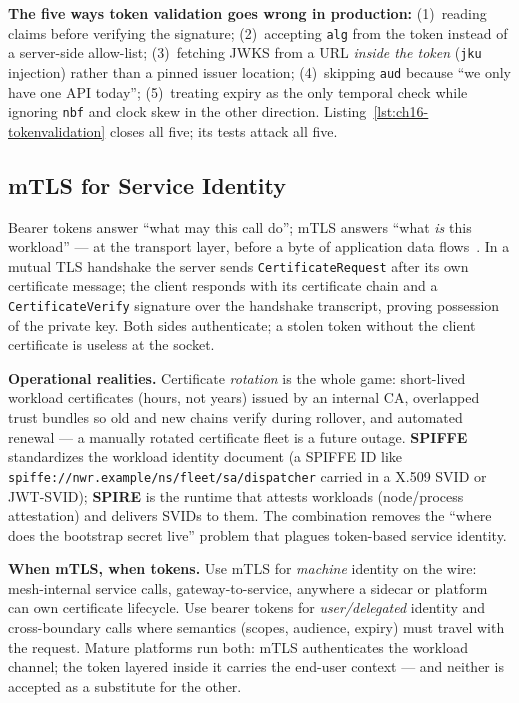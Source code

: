 \begin{warningbox}
\textbf{The five ways token validation goes wrong in production:}
(1)~reading claims before verifying the signature; (2)~accepting
\texttt{alg} from the token instead of a server-side allow-list;
(3)~fetching JWKS from a URL \emph{inside the token} (\texttt{jku}
injection) rather than a pinned issuer location; (4)~skipping
\texttt{aud} because ``we only have one API today''; (5)~treating expiry as
the only temporal check while ignoring \texttt{nbf} and clock skew in the
other direction. Listing~\ref{lst:ch16-tokenvalidation} closes all five;
its tests attack all five.
\end{warningbox}

\subsection{mTLS for Service Identity}
\label{sec:ch16-mtls}

Bearer tokens answer ``what may this call do''; mTLS answers ``what
\emph{is} this workload'' --- at the transport layer, before a byte of
application data flows~\cite{rfc8446}. In a mutual TLS handshake the server
sends \texttt{CertificateRequest} after its own certificate message; the
client responds with its certificate chain and a
\texttt{CertificateVerify} signature over the handshake transcript, proving
possession of the private key. Both sides authenticate; a stolen token
without the client certificate is useless at the socket.

\textbf{Operational realities.} Certificate \emph{rotation} is the whole
game: short-lived workload certificates (hours, not years) issued by an
internal CA, overlapped trust bundles so old and new chains verify during
rollover, and automated renewal --- a manually rotated certificate fleet is
a future outage. \textbf{SPIFFE} standardizes the workload identity
document (a SPIFFE ID like
\texttt{spiffe://nwr.example/ns/fleet/sa/dispatcher} carried in a X.509 SVID
or JWT-SVID); \textbf{SPIRE} is the runtime that attests workloads
(node/process attestation) and delivers SVIDs to them. The combination
removes the ``where does the bootstrap secret live'' problem that plagues
token-based service identity.

\textbf{When mTLS, when tokens.} Use mTLS for \emph{machine} identity on
the wire: mesh-internal service calls, gateway-to-service, anywhere a sidecar
or platform can own certificate lifecycle. Use bearer tokens for
\emph{user/delegated} identity and cross-boundary calls where semantics
(scopes, audience, expiry) must travel with the request. Mature platforms
run both: mTLS authenticates the workload channel; the token layered inside
it carries the end-user context --- and neither is accepted as a substitute
for the other.

